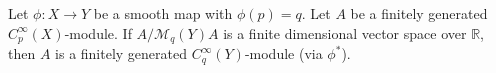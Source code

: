 Let $\phi: X \to Y$ be a smooth map with $\phi(p) = q$. Let $A$ be a finitely generated $C_p^\infty(X)$-module. If $A / \mathcal{M}_q(Y) A$ is a finite dimensional vector space over $\mathbb{R}$, then $A$ is a finitely generated $C_q^\infty(Y)$-module (via $\phi^*$).

